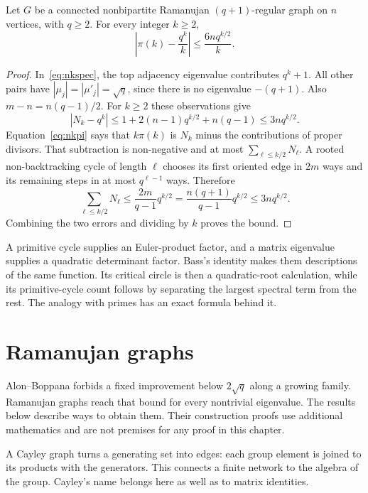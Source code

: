 \begin{theorem}\label{thm:graphpnt}
Let $G$ be a connected nonbipartite Ramanujan $(q+1)$-regular graph on $n$ vertices, with $q\ge2$. For every integer $k\ge2$,
\[
\left|\pi(k)-\frac{q^k}{k}\right|\le\frac{6nq^{k/2}}{k}.
\]
\end{theorem}
\begin{proof}
In~\eqref{eq:nkspec}, the top adjacency eigenvalue contributes $q^k+1$. All other pairs have $|\mu_j|=|\mu'_j|=\sqrt q$, since there is no eigenvalue $-(q+1)$. Also $m-n=n(q-1)/2$. For $k\ge2$ these observations give
\[
|N_k-q^k|\le1+2(n-1)q^{k/2}+n(q-1)\le3nq^{k/2}.
\]
Equation~\eqref{eq:nkpi} says that $k\pi(k)$ is $N_k$ minus the contributions of proper divisors. That subtraction is non-negative and at most $\sum_{\ell\le k/2}N_\ell$. A rooted non-backtracking cycle of length $\ell$ chooses its first oriented edge in $2m$ ways and its remaining steps in at most $q^{\ell-1}$ ways. Therefore
\[
\sum_{\ell\le k/2}N_\ell
\le\frac{2m}{q-1}q^{k/2}
=\frac{n(q+1)}{q-1}q^{k/2}\le3nq^{k/2}.
\]
Combining the two errors and dividing by $k$ proves the bound.
\end{proof}

\begin{beauty}
A primitive cycle supplies an Euler-product factor, and a matrix eigenvalue supplies a quadratic determinant factor. Bass's identity makes them descriptions of the same function. Its critical circle is then a quadratic-root calculation, while its primitive-cycle count follows by separating the largest spectral term from the rest. The analogy with primes has an exact formula behind it.
\end{beauty}

\section{Ramanujan graphs}

Alon--Boppana forbids a fixed improvement below $2\sqrt q$ along a growing family. Ramanujan graphs reach that bound for every nontrivial eigenvalue. The results below describe ways to obtain them. Their construction proofs use additional mathematics and are not premises for any proof in this chapter.

A Cayley graph turns a generating set into edges: each group element is joined to its products with the generators. This connects a finite network to the algebra of the group. Cayley's name belongs here as well as to matrix identities.

